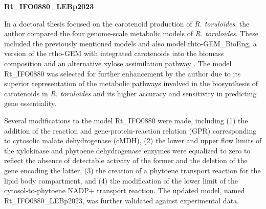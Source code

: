 

\textbf{Rt\_IFO0880\_LEBp2023}

In a doctoral thesis focused on the carotenoid production of \textit{R. toruloides}, the author compared the four genome-scale metabolic models of \textit{R. toruloides}. These included the previously mentioned models and also model rhto-GEM\_BioEng, a version of the rtho-GEM with integrated carotenoids into the biomass composition and an alternative xylose assimilation pathway \cite{Rekena2023}. The model Rt\_IFO0880 was selected for further enhancement by the author due to its superior representation of the metabolic pathways involved in the biosynthesis of carotenoids in \textit{R. toruloides} and its higher accuracy and sensitivity in predicting gene essentiality. \cite{DeBiaggi2023}

Several modifications to the model Rt\_IFO0880 were made, including (1) the addition of the reaction and gene-protein-reaction relation (GPR) corresponding to cytosolic malate dehydrogenase (cMDH), (2) the lower and upper flow limits of the xylokinase and phytoene dehydrogenase enzymes were equalized to zero to reflect the absence of detectable activity of the former and the deletion of the gene encoding the latter, (3) the creation of a phytoene transport reaction for the lipid body compartment, and (4) the modification of the lower limit of the cytosol-to-phytoene NADP+ transport reaction. The updated model, named Rt\_IFO0880\_LEBp2023, was further validated against experimental data. \cite{DeBiaggi2023}


